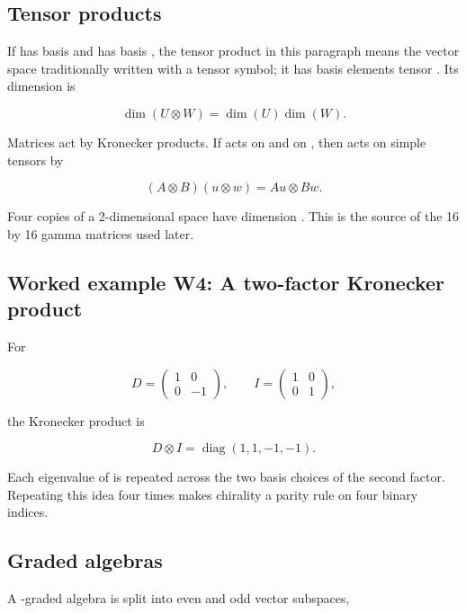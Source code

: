 \documentclass[11pt]{article}
\begin{document}
\subsection{Tensor products}

If \texttt{} has basis \texttt{} and \texttt{} has basis \texttt{}, the tensor product \texttt{} in this paragraph means the vector space traditionally written with a tensor symbol; it has basis elements \texttt{} tensor \texttt{}. Its dimension is

\[
\dim(U\mathbin{\otimes}W)=\dim(U)\dim(W).
\]

Matrices act by Kronecker products. If \texttt{} acts on \texttt{} and \texttt{} on \texttt{}, then \texttt{} acts on simple tensors by

\[
(A\mathbin{\otimes}B)(u\mathbin{\otimes}w)
=Au\mathbin{\otimes}Bw.
\]

Four copies of a 2-dimensional space have dimension \texttt{}. This is the source of the 16 by 16 gamma matrices used later.

\subsection{Worked example W4: A two-factor Kronecker product}

For

\[
D=\begin{pmatrix}1&0\\0&-1\end{pmatrix},
\qquad
I=\begin{pmatrix}1&0\\0&1\end{pmatrix},
\]

the Kronecker product is

\[
D\mathbin{\otimes}I=
\operatorname{diag}(1,1,-1,-1).
\]

Each eigenvalue of \texttt{} is repeated across the two basis choices of the second factor. Repeating this idea four times makes chirality a parity rule on four binary indices.

\subsection{Graded algebras}

A \texttt{}-graded algebra is split into even and odd vector subspaces,
\end{document}
